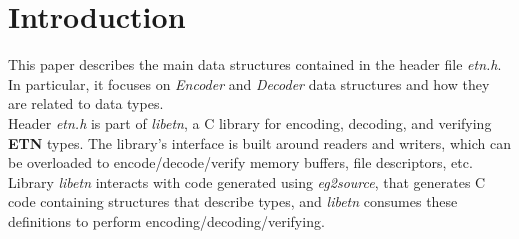 \section*{Introduction}
This paper describes the main data structures contained in the header file \emph{etn.h}. In particular, it focuses on \emph{Encoder} and \emph{Decoder} data structures and how they are related to data types.\\
Header \emph{etn.h} is part of \emph{libetn}, a C library for encoding, decoding, and verifying \textbf{ETN} types. The library's interface is built around readers and writers, which can be overloaded to encode/decode/verify memory buffers, file descriptors, etc.\\
Library \emph{libetn} interacts with code generated using \emph{eg2source}, that generates C code containing structures that describe types, and \emph{libetn} consumes these definitions to perform encoding/decoding/verifying.